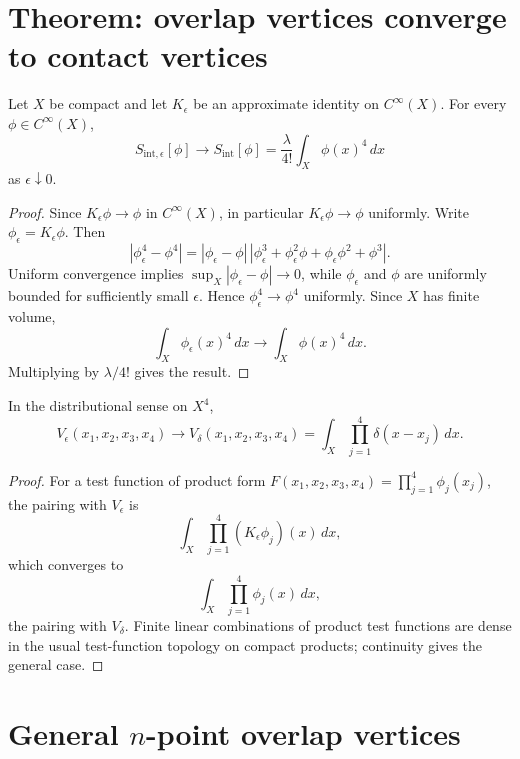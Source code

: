 \documentclass[11pt]{article}
\begin{document}
\section{Theorem: overlap vertices converge to contact vertices}

\begin{theorem}
Let \(X\) be compact and let \(K_\epsilon\) be an approximate identity on \(C^\infty(X)\).
For every \(\phi\in C^\infty(X)\),
\[
S_{\mathrm{int},\epsilon}[\phi]\longrightarrow
S_{\mathrm{int}}[\phi]
=
\frac{\lambda}{4!}\int_X\phi(x)^4\,dx
\]
as \(\epsilon\downarrow0\).
\end{theorem}

\begin{proof}
Since \(K_\epsilon\phi\to\phi\) in \(C^\infty(X)\), in particular
\(K_\epsilon\phi\to\phi\) uniformly.  Write \(\phi_\epsilon=K_\epsilon\phi\).  Then
\[
|\phi_\epsilon^4-\phi^4|
=
|\phi_\epsilon-\phi|\,
|\phi_\epsilon^3+\phi_\epsilon^2\phi+\phi_\epsilon\phi^2+\phi^3|.
\]
Uniform convergence implies \(\sup_X|\phi_\epsilon-\phi|\to0\), while
\(\phi_\epsilon\) and \(\phi\) are uniformly bounded for sufficiently small \(\epsilon\).
Hence \(\phi_\epsilon^4\to\phi^4\) uniformly.  Since \(X\) has finite volume,
\[
\int_X \phi_\epsilon(x)^4\,dx \to \int_X\phi(x)^4\,dx .
\]
Multiplying by \(\lambda/4!\) gives the result.
\end{proof}

\begin{corollary}
In the distributional sense on \(X^4\),
\[
V_\epsilon(x_1,x_2,x_3,x_4)\to
V_\delta(x_1,x_2,x_3,x_4)
=
\int_X\prod_{j=1}^4\delta(x-x_j)\,dx .
\]
\end{corollary}

\begin{proof}
For a test function of product form
\(F(x_1,x_2,x_3,x_4)=\prod_{j=1}^4\phi_j(x_j)\), the pairing with \(V_\epsilon\) is
\[
\int_X\prod_{j=1}^4(K_\epsilon\phi_j)(x)\,dx,
\]
which converges to
\[
\int_X\prod_{j=1}^4\phi_j(x)\,dx,
\]
the pairing with \(V_\delta\).  Finite linear combinations of product test functions are
dense in the usual test-function topology on compact products; continuity gives the general
case.
\end{proof}

\section{General \texorpdfstring{\(n\)}{n}-point overlap vertices}
\end{document}
